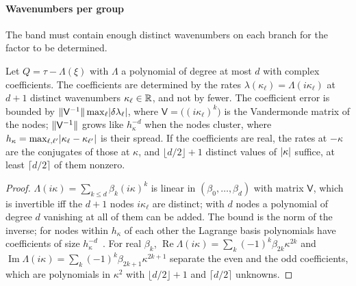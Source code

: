 \paragraph{Wavenumbers per group}
The band must contain enough distinct wavenumbers on each branch for the factor to be determined.

\begin{proposition}\label{prop:counting}
Let $Q=\tau-\Lambda(\xi)$ with $\Lambda$ a polynomial of degree at most $d$ with complex coefficients. The
coefficients are determined by the rates $\lambda(\kappa_\ell)=\Lambda(i\kappa_\ell)$ at $d+1$ distinct wavenumbers
$\kappa_\ell\in\mathbb{R}$, and not by fewer. The coefficient error is bounded by $\lVert\mathsf V^{-1}\rVert\max_\ell\lvert\delta\lambda_\ell\rvert$,
where $\mathsf V=\big((i\kappa_\ell)^k\big)$ is the Vandermonde matrix of the nodes; $\lVert\mathsf V^{-1}\rVert$ grows like
$h_\kappa^{-d}$ when the nodes cluster, where $h_\kappa=\max_{\ell,\ell'}\lvert\kappa_\ell-\kappa_{\ell'}\rvert$ is their spread. If the coefficients are real, the rates at
$-\kappa$ are the conjugates of those at $\kappa$, and $\lfloor d/2\rfloor+1$ distinct values of $\lvert\kappa\rvert$ suffice,
at least $\lceil d/2\rceil$ of them nonzero.
\end{proposition}

\begin{proof}
$\Lambda(i\kappa)=\sum_{k\le d}\beta_k(i\kappa)^k$ is linear in $(\beta_0,\dots,\beta_d)$ with matrix $\mathsf V$,
which is invertible iff the $d+1$ nodes $i\kappa_\ell$ are distinct; with $d$ nodes a polynomial of
degree $d$ vanishing at all of them can be added. The bound is the norm of the inverse; for nodes
within $h_\kappa$ of each other the Lagrange basis polynomials have coefficients of size
$h_\kappa^{-d}$~\cite{Gau62}. For real $\beta_k$, $\operatorname{Re}\Lambda(i\kappa)=\sum_k(-1)^k\beta_{2k}\kappa^{2k}$ and
$\operatorname{Im}\Lambda(i\kappa)=\sum_k(-1)^k\beta_{2k+1}\kappa^{2k+1}$ separate the even and the odd coefficients, which are
polynomials in $\kappa^2$ with $\lfloor d/2\rfloor+1$ and $\lceil d/2\rceil$ unknowns.
\end{proof}


